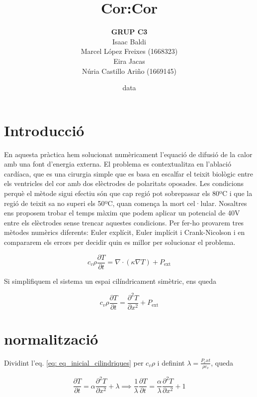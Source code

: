 \documentclass[11pt]{article}
\title{\Huge\bfseries Cor:Cor \\[1ex] \Large}
\author{\begin{tabular}{c}
\textbf{GRUP C3} \\
Isaac Baldi\\
Marcel López Freixes (1668323) \\
Eira Jacas\\
Núria Castillo Ariño (1669145)
\end{tabular}}
\date{data}
\begin{document}
\maketitle

\section{Introducció}


En aquesta pràctica hem solucionat numèricament l'equació de difusió de la calor amb una font d'energia externa. El problema es contextualitza en l'ablació cardíaca, que es una cirurgia simple que es basa en escalfar el teixit biològic entre els ventricles del cor amb dos elèctrodes de polaritats oposades. Les condicions perquè el mètode sigui efectiu són que cap regió pot sobrepassar els 80ºC i que la regió de teixit sa no superi els 50ºC, quan comença la mort cel·lular. Nosaltres ens proposem trobar el temps màxim que podem aplicar un potencial de 40V entre els elèctrodes sense trencar aquestes condicions. Per fer-ho provarem tres mètodes numèrics diferents: Euler explícit, Euler implícit i Crank-Nicolson i en compararem els errors per decidir quin es millor per solucionar el problema.

\begin{equation}
    c_v \rho \frac{\partial T}{\partial t} = \nabla \cdot (\kappa \nabla T) + P_{\text{ext}}
\label{eq: eq_inicial}
\end{equation}


Si simplifiquem el sistema un espai cilíndricament simètric, ens queda


\begin{equation}
    c_v \rho \frac{\partial T}{\partial t} = \frac{\partial^2 T}{\partial x^2} + P_{\text{ext}}
\label{eq: eq_inicial_cilindriques}
\end{equation}
\section{normalització}

Dividint l'eq. \eqref{eq: eq_inicial_cilindriques} per $c_v\rho$ i definint $\lambda=\frac{P_ext}{\rho c_v}$, queda

\begin{equation}
    \frac{\partial T}{\partial t} = \alpha \frac{\partial^2 T}{\partial x^2} + \lambda \implies \frac{1}{\lambda}\frac{\partial T}{\partial t} = \frac{\alpha}{\lambda} \frac{\partial^2 T}{\partial x^2} + 1
\label{eq: eq_entre_rhocv}
\end{equation}
\end{document}
